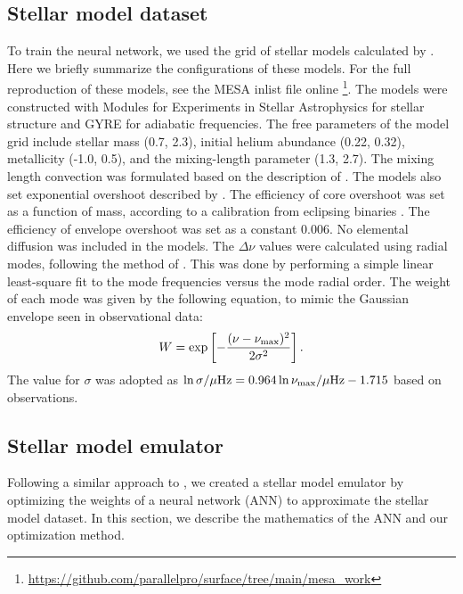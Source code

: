 \documentclass[fleqn,usenatbib]{mnras}
\begin{document}
\subsection{Stellar model dataset}
\label{sec:grid}

To train the neural network, we used the grid of stellar models calculated by \citep{liyg2023}.  
Here we briefly summarize the configurations of these models.
For the full reproduction of these models, see the MESA inlist file online \footnote{\url{https://github.com/parallelpro/surface/tree/main/mesa_work}}.
The models were constructed with Modules for Experiments in Stellar Astrophysics \citep[\textsc{MESA}, version r15140;][]{paxton2011,paxton2013,paxton2015,paxton2018,paxton2019,jermyn2023} for stellar structure and GYRE \citep[version 6.0.1;][]{townsend2013} for adiabatic frequencies. 
The free parameters of the model grid include stellar mass (0.7, 2.3), initial helium abundance (0.22, 0.32), metallicity (-1.0, 0.5), and the mixing-length parameter (1.3, 2.7). 
The mixing length convection was formulated based on the description of \citet{henyey1965}. 
The models also set exponential overshoot described by \citet{herwig2000}. 
The efficiency of core overshoot was set as a function of mass, according to a calibration from eclipsing binaries \citep[equation 2 of ][]{claret2018}. 
The efficiency of envelope overshoot was set as a constant 0.006.
No elemental diffusion was included in the models.
The \(\Delta\nu\) values were calculated using radial modes, following the method of \citep{white2011}. This was done by performing a simple linear least-square fit to the mode frequencies versus the mode radial order. The weight of each mode was given by the following equation, to mimic the Gaussian envelope seen in observational data:
%
\begin{equation}
W = \exp\left[ - \frac{ (\nu - \nu_{\rm max})^2 } { 2 \sigma^2 } \right].
\end{equation} 
%
The value for $\sigma$ was adopted as $\ln \sigma/\mu{\rm Hz} = 0.964 \ln \nu_{\rm max}/\mu{\rm Hz} - 1.715$ based on observations.

\subsection{Stellar model emulator}
\label{sec:emulator}

Following a similar approach to \citet{Lyttle.Davies.ea2021}, we created a stellar model emulator by optimizing the weights of a neural network (ANN) to approximate the stellar model dataset. In this section, we describe the mathematics of the ANN and our optimization method.
\end{document}
